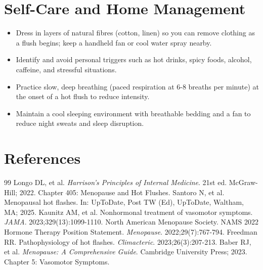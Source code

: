 \section*{Self-Care and Home Management}
\begin{itemize}
  \item Dress in layers of natural fibres (cotton, linen) so you can remove clothing as a flush begins; keep a handheld fan or cool water spray nearby.
  \item Identify and avoid personal triggers such as hot drinks, spicy foods, alcohol, caffeine, and stressful situations.
  \item Practice slow, deep breathing (paced respiration at 6-8 breaths per minute) at the onset of a hot flush to reduce intensity.
  \item Maintain a cool sleeping environment with breathable bedding and a fan to reduce night sweats and sleep disruption.
\end{itemize}

\section*{References}

\begin{thebibliography}{99}
 Longo DL, et al. \emph{Harrison's Principles of Internal Medicine}. 21st ed. McGraw-Hill; 2022. Chapter 405: Menopause and Hot Flushes.
 Santoro N, et al. Menopausal hot flashes. In: UpToDate, Post TW (Ed), UpToDate, Waltham, MA; 2025.
 Kaunitz AM, et al. Nonhormonal treatment of vasomotor symptoms. \emph{JAMA}. 2023;329(13):1099-1110.
 North American Menopause Society. NAMS 2022 Hormone Therapy Position Statement. \emph{Menopause}. 2022;29(7):767-794.
 Freedman RR. Pathophysiology of hot flashes. \emph{Climacteric}. 2023;26(3):207-213.
 Baber RJ, et al. \emph{Menopause: A Comprehensive Guide}. Cambridge University Press; 2023. Chapter 5: Vasomotor Symptoms.
\end{thebibliography}
